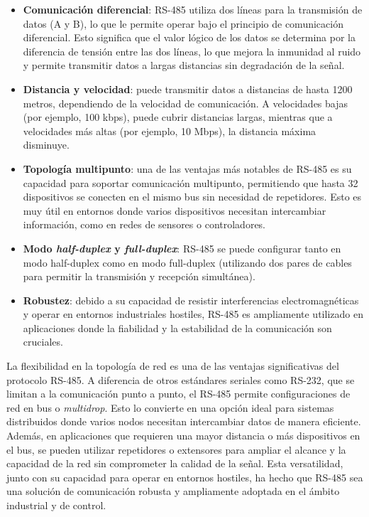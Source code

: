 \begin{itemize}
    \item \textbf{Comunicación diferencial}: RS-485 utiliza dos líneas para la transmisión de datos (A y B), lo que le permite operar bajo el principio de comunicación diferencial. Esto significa que el valor lógico de los datos se determina por la diferencia de tensión entre las dos líneas, lo que mejora la inmunidad al ruido y permite transmitir datos a largas distancias sin degradación de la señal.

    \item \textbf{Distancia y velocidad}: puede transmitir datos a distancias de hasta 1200 metros, dependiendo de la velocidad de comunicación. A velocidades bajas (por ejemplo, 100 kbps), puede cubrir distancias largas, mientras que a velocidades más altas (por ejemplo, 10 Mbps), la distancia máxima disminuye.

    \item \textbf{Topología multipunto}: una de las ventajas más notables de RS-485 es su capacidad para soportar comunicación multipunto, permitiendo que hasta 32 dispositivos se conecten en el mismo bus sin necesidad de repetidores. Esto es muy útil en entornos donde varios dispositivos necesitan intercambiar información, como en redes de sensores o controladores.

    \item \textbf{Modo \textit{half-duplex} y \textit{full-duplex}}: RS-485 se puede configurar tanto en modo half-duplex como en modo full-duplex (utilizando dos pares de cables para permitir la transmisión y recepción simultánea).

    \item \textbf{Robustez}: debido a su capacidad de resistir interferencias electromagnéticas y operar en entornos industriales hostiles, RS-485 es ampliamente utilizado en aplicaciones donde la fiabilidad y la estabilidad de la comunicación son cruciales.

\end{itemize}

La flexibilidad en la topología de red es una de las ventajas significativas del protocolo RS-485. A diferencia de otros estándares seriales como RS-232, que se limitan a la comunicación punto a punto, el RS-485 permite configuraciones de red en bus o \textit{multidrop}. Esto lo convierte en una opción ideal para sistemas distribuidos donde varios nodos necesitan intercambiar datos de manera eficiente. Además, en aplicaciones que requieren una mayor distancia o más dispositivos en el bus, se pueden utilizar repetidores o extensores para ampliar el alcance y la capacidad de la red sin comprometer la calidad de la señal. Esta versatilidad, junto con su capacidad para operar en entornos hostiles, ha hecho que RS-485 sea una solución de comunicación robusta y ampliamente adoptada en el ámbito industrial y de control.